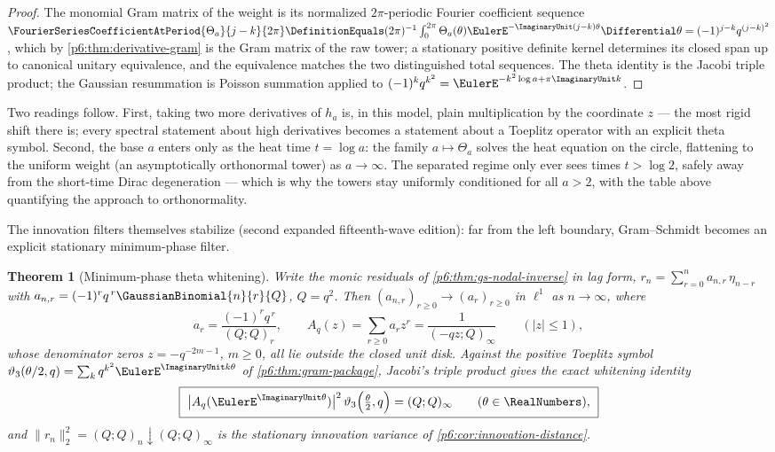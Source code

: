 \documentclass[11pt,oneside]{article}
\numberwithin{equation}{section}
\newtheorem{theorem}{Theorem}[section]
\theoremstyle{definition}
\theoremstyle{remark}
\begin{document}
\begin{proof}
The monomial Gram matrix of the weight is its normalized $2\pi$-periodic Fourier
coefficient sequence
$\FourierSeriesCoefficientAtPeriod{\Theta_a}{j-k}{2\pi}
\DefinitionEquals(2\pi)^{-1}\int_0^{2\pi}\Theta_a(\theta)
\EulerE^{-\ImaginaryUnit(j-k)\theta}\Differential\theta
=(-1)^{j-k}q^{(j-k)^2}$, which by
\cref{p6:thm:derivative-gram} is the Gram matrix of the raw tower; a
stationary positive definite kernel determines its closed span up to
canonical unitary equivalence, and the equivalence matches the two
distinguished total sequences.  The theta identity is the Jacobi triple
product; the Gaussian resummation is Poisson summation applied to
$(-1)^kq^{k^2}=\EulerE^{-k^2\log a+\pi\ImaginaryUnit k}$.
\end{proof}

Two readings follow.  First, taking two more derivatives of $h_a$ is, in
this model, plain multiplication by the coordinate $z$ --- the most rigid
shift there is; every spectral statement about high derivatives becomes a
statement about a Toeplitz operator with an explicit theta symbol.  Second,
the base $a$ enters only as the heat time $t=\log a$: the family
$a\mapsto\Theta_a$ solves the heat equation on the circle, flattening to the
uniform weight (an asymptotically orthonormal tower) as $a\to\infty$.  The
separated regime only ever sees times $t>\log2$, safely away from the
short-time Dirac degeneration --- which is why the towers stay uniformly
conditioned for all $a>2$, with the table above quantifying the approach to
orthonormality.

The innovation filters themselves stabilize (second expanded
fifteenth-wave edition): far from the left boundary, Gram--Schmidt becomes
an explicit stationary minimum-phase filter.

\begin{theorem}[Minimum-phase theta whitening]\label{p6:thm:theta-whitening}
Write the monic residuals of \cref{p6:thm:gs-nodal-inverse} in lag form,
$r_n=\sum_{r=0}^{n}a_{n,r}\,\eta_{n-r}$ with
$a_{n,r}=(-1)^rq^{\,r}\GaussianBinomial{n}{r}{Q}$, $Q=q^2$.  Then
$(a_{n,r})_{r\ge0}\to(a_r)_{r\ge0}$ in $\ell^1$ as $n\to\infty$, where
\[
 a_r=\frac{(-1)^rq^{\,r}}{(Q;Q)_r},
 \qquad
 A_q(z)=\sum_{r\ge0}a_rz^r=\frac1{(-qz;Q)_\infty}
 \qquad(|z|\le1),
\]
whose denominator zeros $z=-q^{-2m-1}$, $m\ge0$, all lie outside the
closed unit disk.  Against the positive Toeplitz symbol
$\vartheta_3(\theta/2,q)=\sum_kq^{k^2}\EulerE^{\ImaginaryUnit k\theta}$ of
\cref{p6:thm:gram-package}, Jacobi's triple product gives the exact
whitening identity
\begin{equation}\label{p6:eq:theta-whitening}
 \boxed{\ \bigl|A_q(\EulerE^{\ImaginaryUnit\theta})\bigr|^2\,
 \vartheta_3\Bigl(\tfrac\theta2,q\Bigr)=(Q;Q)_\infty
 \qquad(\theta\in\RealNumbers),\ }
\end{equation}
and $\|r_n\|_2^2=(Q;Q)_n\downarrow(Q;Q)_\infty$ is the stationary
innovation variance of \cref{p6:cor:innovation-distance}.
\end{theorem}
\end{document}
